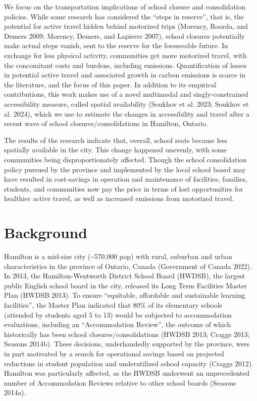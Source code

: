 \documentclass[
default
]{sn-jnl}
\begin{document}
We focus on the transportation implications of school closure and
consolidation policies. While some research has considered the ``steps
in reserve'', that is, the potential for active travel hidden behind
motorized trips (Morency, Roorda, and Demers 2009; Morency, Demers, and
Lapierre 2007), school closures potentially make actual steps vanish,
sent to the reserve for the foreseeable future. In exchange for less
physical activity, communities get more motorized travel, with the
concomitant costs and burdens, including emissions. Quantification of
losses in potential active travel and associated growth in carbon
emissions is scarce in the literature, and the focus of this paper. In
addition to its empirical contributions, this work makes use of a novel
multimodal and singly-constrained accessibility measure, called spatial
availability (Soukhov et al. 2023; Soukhov et al. 2024), which we use to
estimate the changes in accessibility and travel after a recent wave of
school closures/consolidations in Hamilton, Ontario.

The results of the research indicate that, overall, school seats became
less spatially available in the city. This change happened unevenly,
with some communities being disproportionately affected. Though the
school consolidation policy pursued by the province and implemented by
the local school board may have resulted in cost-savings in operation
and maintenance of facilities, families, students, and communities now
pay the price in terms of lost opportunities for healthier active
travel, as well as increased emissions from motorized travel.

\section{Background}\label{background}

Hamilton is a mid-size city (\textasciitilde570,000 pop) with rural,
suburban and urban characteristics in the province of Ontario, Canada
(Government of Canada 2022). In 2013, the Hamilton-Wentworth District
School Board (HWDSB), the largest public English school board in the
city, released its Long Term Facilities Master Plan (HWDSB 2013). To
ensure ``equitable, affordable and sustainable learning facilities'',
the Master Plan indicated that 80\% of its elementary schools (attended
by students aged 5 to 13) would be subjected to accommodation
evaluations, including an ``Accommodation Review'', the outcome of which
historically has been school closures/consolidations (HWDSB 2013; Craggs
2013; Seasons 2014b). These decisions, underhandedly supported by the
province, were in part motivated by a search for operational savings
based on projected reductions in student population and underutilized
school capacity (Craggs 2012). Hamilton was particularly affected, as
the HWDSB underwent an unprecedented number of Accommodation Reviews
relative to other school boards (Seasons 2014a).
\end{document}
